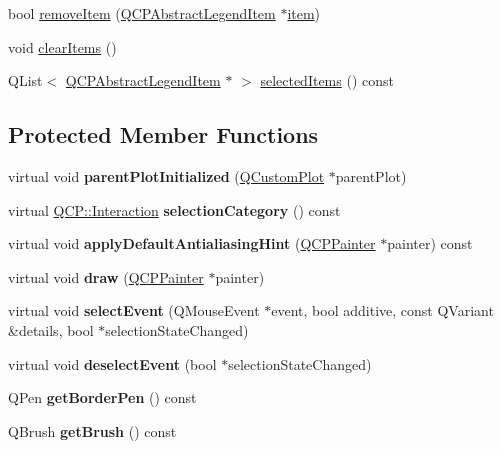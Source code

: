 \begin{DoxyCompactItemize}
\item 
bool \hyperlink{class_q_c_p_legend_a2aea4ec6da2d454dd0b241a254d65082}{remove\+Item} (\hyperlink{class_q_c_p_abstract_legend_item}{Q\+C\+P\+Abstract\+Legend\+Item} $\ast$\hyperlink{class_q_c_p_legend_acfe9694c45104a3359d3806ed366fcf7}{item})
\item 
void \hyperlink{class_q_c_p_legend_a24795c7250eb5214fcea16b7217b4dfb}{clear\+Items} ()
\item 
Q\+List$<$ \hyperlink{class_q_c_p_abstract_legend_item}{Q\+C\+P\+Abstract\+Legend\+Item} $\ast$ $>$ \hyperlink{class_q_c_p_legend_ac7d9e567d5c551e09cd9bcc4306c5532}{selected\+Items} () const
\end{DoxyCompactItemize}
\subsection*{Protected Member Functions}
\begin{DoxyCompactItemize}
\item 
\hypertarget{class_q_c_p_legend_a4d552c63d82742d77fb7f177bae7b1ba}{}\label{class_q_c_p_legend_a4d552c63d82742d77fb7f177bae7b1ba} 
virtual void {\bfseries parent\+Plot\+Initialized} (\hyperlink{class_q_custom_plot}{Q\+Custom\+Plot} $\ast$parent\+Plot)
\item 
\hypertarget{class_q_c_p_legend_a8e11032dd41db9e53fd3ab0c3c813202}{}\label{class_q_c_p_legend_a8e11032dd41db9e53fd3ab0c3c813202} 
virtual \hyperlink{namespace_q_c_p_a2ad6bb6281c7c2d593d4277b44c2b037}{Q\+C\+P\+::\+Interaction} {\bfseries selection\+Category} () const
\item 
\hypertarget{class_q_c_p_legend_a1aea4fc7cdde130a58d0d225440cdbbb}{}\label{class_q_c_p_legend_a1aea4fc7cdde130a58d0d225440cdbbb} 
virtual void {\bfseries apply\+Default\+Antialiasing\+Hint} (\hyperlink{class_q_c_p_painter}{Q\+C\+P\+Painter} $\ast$painter) const
\item 
\hypertarget{class_q_c_p_legend_a4462151bf875ca85fa3815457c683fdc}{}\label{class_q_c_p_legend_a4462151bf875ca85fa3815457c683fdc} 
virtual void {\bfseries draw} (\hyperlink{class_q_c_p_painter}{Q\+C\+P\+Painter} $\ast$painter)
\item 
\hypertarget{class_q_c_p_legend_af93bf87dc5c383a9d2ada80b35f3a1a5}{}\label{class_q_c_p_legend_af93bf87dc5c383a9d2ada80b35f3a1a5} 
virtual void {\bfseries select\+Event} (Q\+Mouse\+Event $\ast$event, bool additive, const Q\+Variant \&details, bool $\ast$selection\+State\+Changed)
\item 
\hypertarget{class_q_c_p_legend_a5208ead4331c9b0440f768f059777c58}{}\label{class_q_c_p_legend_a5208ead4331c9b0440f768f059777c58} 
virtual void {\bfseries deselect\+Event} (bool $\ast$selection\+State\+Changed)
\item 
\hypertarget{class_q_c_p_legend_a1cf9df6f2130c5ad842dc92188ab6bd7}{}\label{class_q_c_p_legend_a1cf9df6f2130c5ad842dc92188ab6bd7} 
Q\+Pen {\bfseries get\+Border\+Pen} () const
\item 
\hypertarget{class_q_c_p_legend_ab1438d5d67304cdda3b9339da580d6bc}{}\label{class_q_c_p_legend_ab1438d5d67304cdda3b9339da580d6bc} 
Q\+Brush {\bfseries get\+Brush} () const
\end{DoxyCompactItemize}

